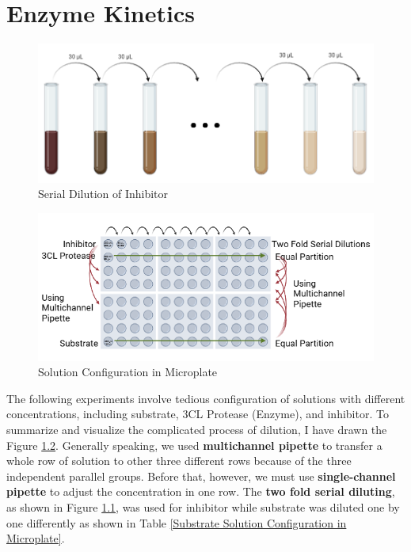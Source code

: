 \documentclass{report}
\begin{document}
\chapter{Enzyme Kinetics}
\begin{figure}
    \centering
    \includegraphics[width=0.7\linewidth]{../Figures/serial dilution.png}
    \caption{Serial Dilution of Inhibitor}
    \label{Serial Dilution of Inhibitor}
\end{figure}
\begin{figure}
    \centering
    \includegraphics[width=1\linewidth]{../Figures/microplate.png}
    \caption{Solution Configuration in Microplate}
    \label{Inhibitor Solution Configuration in Microplate}
\end{figure}
The following experiments involve tedious configuration of solutions with different concentrations, including substrate, 3CL Protease (Enzyme), and inhibitor.
To summarize and visualize the complicated process of dilution, I have drawn the Figure \ref{Inhibitor Solution Configuration in Microplate}.
Generally speaking, we used \textbf{multichannel pipette} to transfer a whole row of solution to other three different rows because of the three independent parallel groups.
Before that, however, we must use \textbf{single-channel pipette} to adjust the concentration in one row.
The \textbf{two fold serial diluting}, as shown in Figure \ref{Serial Dilution of Inhibitor}, was used for inhibitor while substrate was diluted one by one differently as shown in Table \ref{Substrate Solution Configuration in Microplate}.
\end{document}
